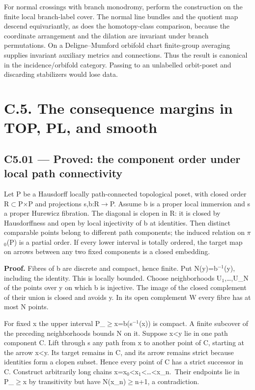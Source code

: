 For normal crossings with branch monodromy, perform the construction on the finite local branch-label cover. The normal line bundles and the quotient map descend equivariantly, as does the homotopy-class comparison, because the coordinate arrangement and the dilation are invariant under branch permutations. On a Deligne--Mumford orbifold chart finite-group averaging supplies invariant auxiliary metrics and connections. Thus the result is canonical in the incidence/orbifold category. Passing to an unlabelled orbit-poset and discarding stabilizers would lose data.

\section{C.5. The consequence margins in TOP, PL, and smooth}\label{c.5.-the-consequence-margins-in-top-pl-and-smooth}

\subsection{C5.01 --- Proved: the component order under local path connectivity}\label{c5.01-proved-the-component-order-under-local-path-connectivity}

Let P be a Hausdorff locally path-connected topological poset, with closed order R\ensuremath{\subset}P\ensuremath{\times}P and projections s,b:R\ensuremath{\to}P. Assume b is a proper local immersion and s a proper Hurewicz fibration. The diagonal is clopen in R: it is closed by Hausdorffness and open by local injectivity of b at identities. Then distinct comparable points belong to different path components; the induced relation on \ensuremath{\pi}\ensuremath{{}_{0}}(P) is a partial order. If every lower interval is totally ordered, the target map on arrows between any two fixed components is a closed embedding.

\textbf{Proof.} Fibres of b are discrete and compact, hence finite. Put N(y)=\textbar b\ensuremath{{}^{-1}}(y)\textbar, including the identity. This is locally bounded. Choose neighborhoods U\ensuremath{{}_{1}},\ldots,U\_N of the points over y on which b is injective. The image of the closed complement of their union is closed and avoids y. In its open complement W every fibre has at most N points.

For fixed x the upper interval P\_\ensuremath{\ge}x=b(s\ensuremath{{}^{-1}}(x)) is compact. A finite subcover of the preceding neighborhoods bounds N on it. Suppose x\textless y lie in one path component C. Lift through s any path from x to another point of C, starting at the arrow x\textless y. Its target remains in C, and its arrow remains strict because identities form a clopen subset. Hence every point of C has a strict successor in C. Construct arbitrarily long chains x=x\ensuremath{{}_{0}}\textless x\ensuremath{{}_{1}}\textless\ldots\textless x\_n.~Their endpoints lie in P\_\ensuremath{\ge}x by transitivity but have N(x\_n)\ensuremath{\ge}n+1, a contradiction.


